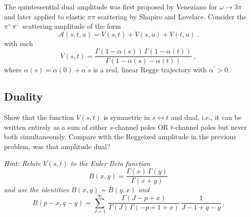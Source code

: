 The quintessential dual amplitude was first proposed by Veneziano for $\omega\to3\pi$ and later applied to elastic $\pi\pi$ scattering by Shapiro and Lovelace. Consider the $\pi^+\pi^-$ scattering amplitude of the form
    \begin{equation}
        \label{eq:Astu}
        \mathcal{A}(s,t,u) = V(s,t) + V(s,u) + V(t,u) ~.
    \end{equation}
with each 
    \begin{equation}   
        \label{eq:Fst}
        V(s,t) = \frac{\Gamma(1-\alpha(s)) \, \Gamma(1-\alpha(t))}{\Gamma(1-\alpha(s) - \alpha(t))} ~,
    \end{equation}
where $\alpha(s) = \alpha(0) + \alpha^\prime s$ is a real, linear Regge trajectory with $\alpha^\prime > 0$. 

\subsection{Duality} 
Show that the function $V(s,t)$ is symmetric in $s\leftrightarrow t$ and dual, i.e., it can be written entirely as a sum of either $s$-channel poles OR $t$-channel poles but never both simultaneously. Compare with the Reggeized amplitude in the previous problem, was that amplitude dual?

\noindent \textit{Hint: Relate $V(s,t)$ to the Euler Beta function
    \begin{equation}
        B(x,y) = \frac{\Gamma(x) \, \Gamma(y)}{\Gamma(x+y)}
    \end{equation}
and use the identities $B(x,y) = B(y,x)$ and
    \begin{equation}
        B(p-x, q-y) = \sum_{J=1}^\infty \, \frac{\Gamma(J-p+x)}{\Gamma(J) \, \Gamma(-p + 1 +x)} \, \frac{1}{J-1+q-y} ~.
    \end{equation}
}

